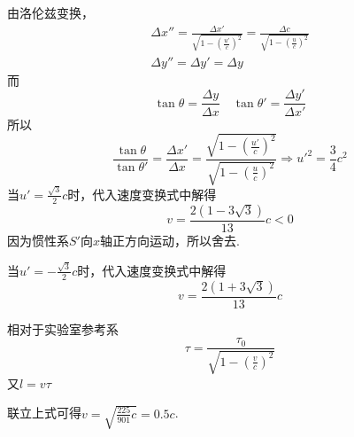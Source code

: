 \documentclass[b5paper,opensource]{./template/qyxf-book}
\begin{document}
由洛伦兹变换，
\begin{align*}
\Delta x''=\frac{\Delta x'}{\sqrt{1-(\frac{u'}{c})^2}}=\frac{\Delta c}{\sqrt{1-(\frac{u}{c})^2}}\\\Delta y''=\Delta y'=\Delta y
\end{align*}
而
\begin{equation*}
\tan{\theta}=\frac{\Delta y}{\Delta x}\quad \tan{\theta'}=\frac{\Delta y'}{\Delta x'}
\end{equation*}
所以
\begin{equation*}
\frac{\tan{\theta}}{\tan{\theta'}}=\frac{\Delta x'}{\Delta x}=\frac{\sqrt{1-(\frac{u'}{c})^2}}{\sqrt{1-(\frac{u}{c})^2}}\Rightarrow u'^2=\frac{3}{4}c^2
\end{equation*}
当$u'=\frac{\sqrt{3}}{2}c$时，代入速度变换式中解得
\begin{equation*}
v=\frac{2(1-3\sqrt{3})}{13}c<0
\end{equation*}
因为惯性系$S'$向$x$轴正方向运动，所以舍去.

当$u'=-\frac{\sqrt{3}}{2}c$时，代入速度变换式中解得
\begin{equation*}
v=\frac{2(1+3\sqrt{3})}{13}c
\end{equation*}


\solve
相对于实验室参考系
\begin{equation*}
\tau=\frac{\tau_0}{\sqrt{1-(\frac{v}{c})^2}}
\end{equation*}
又$l=v\tau$

联立上式可得$v=\sqrt{\frac{225}{901}c}=0.5c$.
\end{document}
